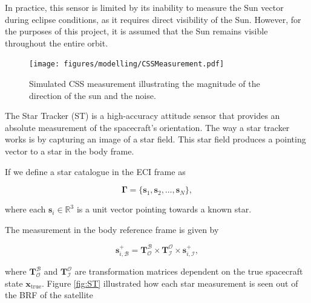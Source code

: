 \noindent In practice, this sensor is limited by its inability to measure the Sun vector during eclipse conditions, as it requires direct visibility of the Sun. 
However, for the purposes of this project, it is assumed that the Sun remains visible throughout the entire orbit.
\vspace{0.5cm}

\begin{figure}[H]
    \centering
    \texttt{[image: figures/modelling/CSSMeasurement.pdf]}
    \caption{Simulated CSS measurement illustrating the magnitude of the direction of the sun and the noise.}
    \label{fig:CSSM}
\end{figure}

\label{sec:STModel}

The Star Tracker (ST) is a high-accuracy attitude sensor that provides an absolute measurement of the spacecraft's orientation. The way a star tracker works
is by capturing an image of a star field. This star field produces a pointing vector to a star in the body frame. 
\vspace{0.5cm}

\noindent If we define a star catalogue in the ECI frame as 

\begin{equation}
    \boldsymbol{\Gamma} = \{\mathbf{s}_1, \mathbf{s}_2, \ldots, \mathbf{s}_N\},
\end{equation}

\noindent where each \(\mathbf{s}_i \in \mathbb{R}^3\) is a unit vector pointing towards a known star.
\vspace{0.5cm}

\noindent The measurement in the body reference frame is given by

\begin{equation}
    \mathbf{s}_{i,\mathcal{B}}^+ = \mathbf{T}^\mathcal{B}_\mathcal{O} \times \mathbf{T}^\mathcal{O}_\mathcal{I} \times \mathbf{s}_{i,\mathcal{I}}^+,
\end{equation}

\noindent where \(\mathbf{T}^\mathcal{B}_\mathcal{O}\) and \(\mathbf{T}^\mathcal{O}_\mathcal{I}\) are transformation matrices dependent on the true spacecraft state \(\mathbf{x}_\text{true}\). Figure \ref{fig:ST} illustrated how each star measurement is seen out of the BRF of the satellite
\vspace{0.5cm}

